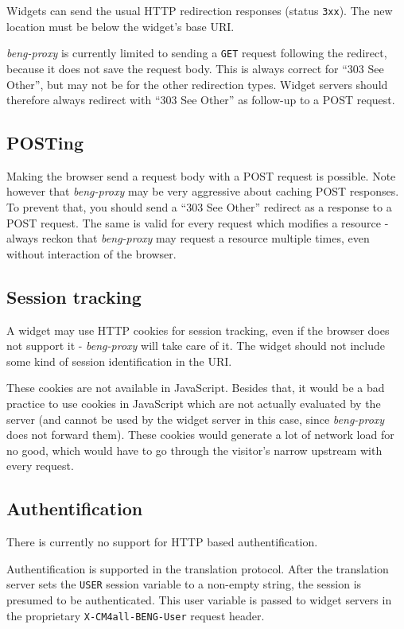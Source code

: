 \documentclass[a4paper,12pt]{article}
\begin{document}
Widgets can send the usual HTTP redirection responses (status
\texttt{3xx}).  The new location must be below the widget's base URI.

\emph{beng-proxy} is currently limited to sending a \texttt{GET}
request following the redirect, because it does not save the request
body.  This is always correct for ``303 See Other'', but may not be
for the other redirection types.  Widget servers should therefore
always redirect with ``303 See Other'' as follow-up to a POST request.

\subsection{POSTing}

Making the browser send a request body with a POST request is
possible.  Note however that \emph{beng-proxy} may be very aggressive
about caching POST responses.  To prevent that, you should send a
``303 See Other'' redirect as a response to a POST request.  The same
is valid for every request which modifies a resource - always reckon
that \emph{beng-proxy} may request a resource multiple times, even
without interaction of the browser.

\subsection{Session tracking}

A widget may use HTTP cookies for session tracking, even if the
browser does not support it - \emph{beng-proxy} will take care of it.
The widget should not include some kind of session identification in
the URI.

These cookies are not available in JavaScript.  Besides that, it would
be a bad practice to use cookies in JavaScript which are not actually
evaluated by the server (and cannot be used by the widget server in
this case, since \emph{beng-proxy} does not forward them).  These
cookies would generate a lot of network load for no good, which would
have to go through the visitor's narrow upstream with every request.

\subsection{Authentification}

There is currently no support for HTTP based authentification.

Authentification is supported in the translation protocol.  After the
translation server sets the \texttt{USER} session variable to a
non-empty string, the session is presumed to be authenticated.  This
user variable is passed to widget servers in the proprietary
\texttt{X-CM4all-BENG-User} request header.
\end{document}
